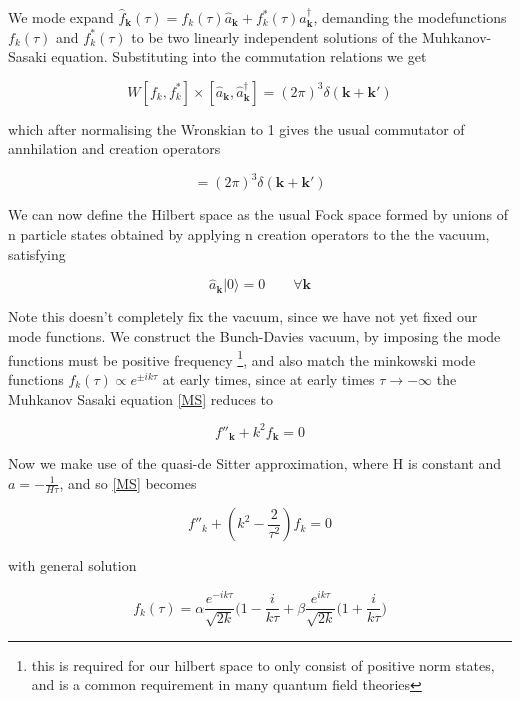 \documentclass[a4paper,10pt]{article}
\renewcommand{\v}[1]{\mathbf{#1}}
\newcommand{\ann}[1]{\hat{a}_{\v{#1}}}
\newcommand{\cre}[1]{\hat{a}^\dagger_{\v{#1}}}
\newcommand{\vac}{|0\rangle}
\begin{document}
We mode expand $\hat{f}_{\v{k}}(\tau) = f_k(\tau)\ann{k}+f_k^*(\tau)\cre{k}$, demanding the modefunctions $f_k(\tau)$ and $f_k^*(\tau)$ to be two linearly independent solutions of the Muhkanov-Sasaki equation. Substituting into the commutation relations we get 

\begin{equation}
W[f_k,f_k^*]\times[\ann{k}, \cre{k}] = (2\pi)^3\delta(\v{k}+\v{k'})
\end{equation}

which after normalising the Wronskian to 1 gives the usual commutator of annhilation and creation operators

\begin{equation}
[\ann{k}, \cre{k}] = (2\pi)^3\delta(\v{k}+\v{k'})
\end{equation}

We can now define the Hilbert space as the usual Fock space formed by unions of n particle states obtained by applying n creation operators to the the vacuum, satisfying 

\begin{equation}
\ann{k}\vac =0 \qquad \forall \v{k}
\end{equation}

Note this doesn't completely fix the vacuum, since we have not yet fixed our mode functions. We construct the Bunch-Davies vacuum, by imposing the mode functions must be positive frequency \footnote{this is required for our hilbert space to only consist of positive norm states, and is a common requirement in many quantum field theories}, and also match the minkowski mode functions $f_k(\tau) \propto e^{\pm ik\tau}$ at early times, since at early times $\tau \rightarrow -\infty$ the Muhkanov Sasaki equation \ref{MS} reduces to 

\begin{equation}
f''_{\v{k}} + k^2f_{\v{k}} = 0
\end{equation}

Now we make use of the quasi-de Sitter approximation, where H is constant and $a=-\frac{1}{H\tau}$, and so \ref{MS} becomes

\begin{equation}
f''_k + (k^2-\frac{2}{\tau^2})f_k = 0
\end{equation}

with general solution

\begin{equation}
f_k(\tau) = \alpha \frac{e^{-ik\tau}}{\sqrt{2k}}{(1-\frac{i}{k\tau}} + \beta \frac{e^{ik\tau}}{\sqrt{2k}}{(1+\frac{i}{k\tau}})
\end{equation}
\end{document}
